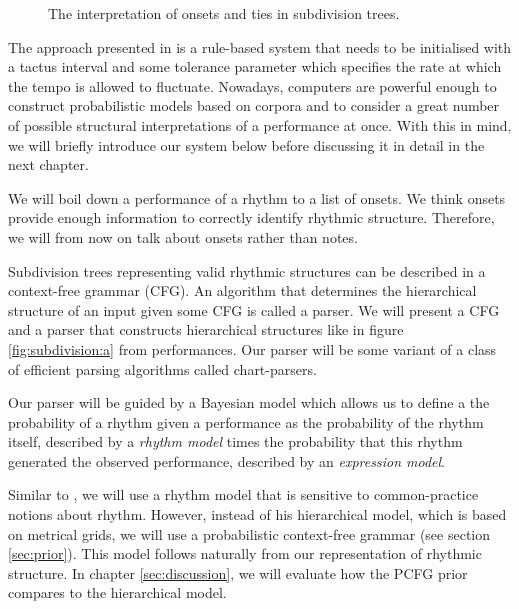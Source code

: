 \begin{figure}
\centering
{}

\caption{The interpretation of onsets and ties in subdivision trees.}
\label{fig:ties}
\end{figure}

The approach presented in \citet{longuet1976perception} is a rule-based system that needs to be initialised with a tactus interval and some tolerance parameter which specifies the rate at which the tempo is allowed to fluctuate. Nowadays, computers are powerful enough to construct probabilistic models based on corpora and to consider a great number of possible structural interpretations of a performance at once. With this in mind, we will briefly introduce our system below before discussing it in detail in the next chapter.

We will boil down a performance of a rhythm to a list of onsets. We think onsets provide enough information to correctly identify rhythmic structure. Therefore, we will from now on talk about onsets rather than notes.

Subdivision trees representing valid rhythmic structures can be described in a context-free grammar (CFG). An algorithm that determines the hierarchical structure of an input given some CFG is called a parser. We will present a CFG and a parser that constructs hierarchical structures like in figure \ref{fig:subdivision:a} from performances. Our parser will be some variant of a class of efficient parsing algorithms called chart-parsers.

Our parser will be guided by a Bayesian model which allows us to define a the probability of a rhythm given a performance as the probability of the rhythm itself, described by a \textit{rhythm model} times the probability that this rhythm generated the observed performance, described by an \textit{expression model}.

Similar to \cite{temperley2009unified}, we will use a rhythm model that is sensitive to common-practice notions about rhythm. However, instead of his hierarchical model, which is based on metrical grids, we will use a probabilistic context-free grammar (see section \ref{sec:prior}). This model follows naturally from our representation of rhythmic structure. In chapter \ref{sec:discussion}, we will evaluate how the PCFG prior compares to the hierarchical model.

